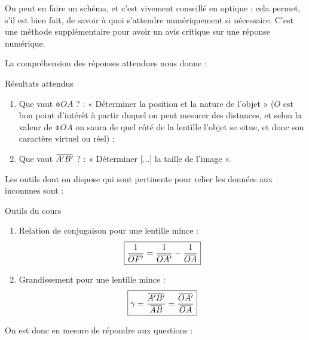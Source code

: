 \documentclass[10pt,a5paper,notitlepage]{book}
\begin{document}
On peut en faire un schéma, et c'est vivement conseillé en optique : cela
permet, s'il est bien fait, de savoir à quoi s'attendre numériquement si
nécessaire. C'est une méthode supplémentaire pour avoir un avis critique sur une
réponse numérique. \smallbreak

La compréhension des réponses attendues nous donne :
\begin{NCprop}{Résultats attendus}
    \begin{enumerate}
        \item Que vaut $ \obar{OA}$ ? : « Déterminer la position et la nature de
            l'objet » ($O$ est bon point d'intérêt à partir duquel on peut
            mesurer des distances, et selon la valeur  de
            $\obar{OA}$ on saura de quel côté de la lentille l'objet se situe,
            et donc son caractère virtuel ou réel) ;
        \item Que vaut $\ABp$ ? : « Déterminer [...] la taille de l'image ».
    \end{enumerate}
\end{NCprop}

Les outils dont on dispose qui sont pertinents pour relier les données aux
inconnues sont :
\begin{NCdemo}{Outils du cours}
    \begin{enumerate}
        \item Relation de conjugaison pour une lentille mince :
            \[ \boxed{ \frac{1}{\OF} = \frac{1}{\OAp} - \frac{1}{\OA}}\]
        \item Grandissement pour une lentille mince :
            \[\boxed{\g = \frac{\ABp}{\ABb} = \frac{\OAp}{\OA}}\]
    \end{enumerate}
\end{NCdemo}

On est donc en mesure de répondre aux questions :
\end{document}
